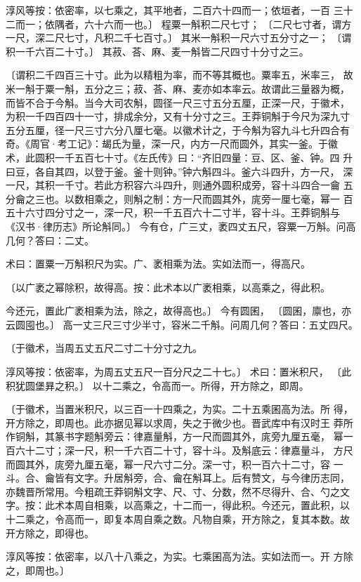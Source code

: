 \documentclass[a4paper,12pt,UTF8,twoside]{ctexbook}
\begin{document}
淳风等按：依密率，以七乘之，其平地者，二百六十四而一；依垣者，一百 三十二而一；依隅者，六十六而一也。〕 程粟一斛积二尺七寸； 〔二尺七寸者，谓方一尺，深二尺七寸，凡积二千七百寸。〕 其米一斛积一尺六寸五分寸之一； 〔谓积一千六百二十寸。〕 其菽、荅、麻、麦一斛皆二尺四寸十分寸之三。

〔谓积二千四百三十寸。此为以精粗为率，而不等其概也。粟率五，米率三， 故米一斛于粟一斛，五分之三；菽、荅、麻、麦亦如本率云。故谓此三量器为概， 而皆不合于今斛。当今大司农斛，圆径一尺三寸五分五厘，正深一尺，于徽术， 为积一千四百四十一寸，排成余分，又有十分寸之三。王莽铜斛于今尺为深九寸 五分五厘，径一尺三寸六分八厘七毫。以徽术计之，于今斛为容九斗七升四合有 奇。《周官·考工记》：朅氏为量，深一尺，内方一尺而圆外，其实一釜。于徽 术，此圆积一千五百七十寸。《左氏传》曰：“齐旧四量：豆、区、釜、钟。四 升曰豆，各自其四，以登于釜。釜十则钟。”钟六斛四斗。釜六斗四升，方一尺， 深一尺，其积一千寸。若此方积容六斗四升，则通外圆积成旁，容十斗四合一龠 五分龠之三也。以数相乘之，则斛之制：方一尺而圆其外，庣旁一厘七毫，幂一 百五十六寸四分寸之一，深一尺，积一千五百六十二寸半，容十斗。王莽铜斛与 《汉书·律历志》所论斛同。〕 今有仓，广三丈，袤四丈五尺，容粟一万斛。问高几何？答曰：二丈。

术曰：置粟一万斛积尺为实。广、袤相乘为法。实如法而一，得高尺。

〔以广袤之幂除积，故得高。按：此术本以广袤相乘，以高乘之，得此积。

今还元，置此广袤相乘为法，除之，故得高也。〕 今有圆囷， 〔圆囷，廪也，亦云圆囤也。〕 高一丈三尺三寸少半寸，容米二千斛。问周几何？答曰：五丈四尺。

〔于徽术，当周五丈五尺二寸二十分寸之九。

淳风等按：依密率，为周五丈五尺一百分尺之二十七。〕 术曰：置米积尺， 〔此积犹圆堡昪之积。〕 以十二乘之，令高而一。所得，开方除之，即周。

〔于徽术，当置米积尺，以三百一十四乘之，为实。二十五乘囷高为法。所 得，开方除之，即周也。此亦据见幂以求周，失之于微少也。晋武库中有汉时王 莽所作铜斛，其篆书字题斛旁云：律嘉量斛，方一尺而圆其外，庣旁九厘五毫， 幂一百六十二寸；深一尺，积一千六百二十寸，容十斗。及斛底云：律嘉量斗， 方尺而圆其外，庣旁九厘五毫，幂一尺六寸二分。深一寸，积一百六十二寸，容 一斗。合、龠皆有文字。升居斛旁，合、龠在斛耳上。后有赞文，与今律历志同， 亦魏晋所常用。今粗疏王莽铜斛文字、尺、寸、分数，然不尽得升、合、勺之文 字。按：此术本周自相乘，以高乘之，十二而一，得此积。今还元，置此积，以 十二乘之，令高而一，即复本周自乘之数。凡物自乘，开方除之，复其本数。故 开方除之，即得也。

淳风等按：依密率，以八十八乘之，为实。七乘囷高为法。实如法而一。开 方除之，即周也。〕 
\end{document}
